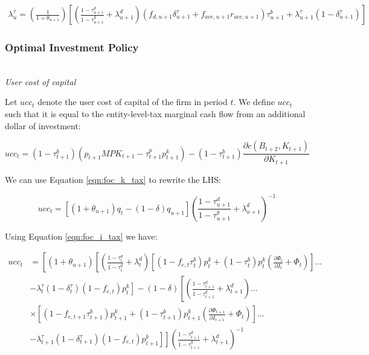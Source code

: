  \begin{equation}
\label{eqn:foc_ktau_tax}
\begin{split}
 \lambda^{\tau}_{u} = \left(\frac{1}{1+\theta_{u+1}}\right)\left[\left(\frac{1-\tau^{d}_{u+1}}{1-\tau^{g}_{u+1}} + \lambda^{d}_{u+1} \right)\left(f_{d,u+1}\delta^{\tau}_{u+1}+f_{ace,u+1}r_{ace,u+1}\right)\tau^{b}_{u+1} + \lambda^{\tau}_{u+1}(1-\delta^{\tau}_{u+1})\right] 
 \end{split}
\end{equation}



\subsubsection{Optimal Investment Policy}

\ \\
\noindent\noindent \emph{User cost of capital}

Let $ucc_{t}$ denote the user cost of capital of the firm in period $t$.  We define $ucc_{t}$ such that it is equal to the entity-level-tax marginal cash flow from an additional dollar of investment:

\begin{equation}
ucc_{t} = (1-\tau^{b}_{t+1})\left(p_{t+1}MPK_{t+1}-\tau^{p}_{t+1}p^{k}_{t+1}\right)- (1-\tau^{b}_{t+1}) \frac{\partial c(B_{t+2},K_{t+1})}{\partial K_{t+1}}
\end{equation}


We can use Equation \ref{eqn:foc_k_tax} to rewrite the LHS:

\begin{equation}
ucc_{t} =  \left[\left({1+\theta_{u+1}}\right)q_{t} - (1-\delta)q_{u+1}\right] \left(\frac{1-\tau^{d}_{u+1}}{1-\tau^{g}_{u+1}} + \lambda^{d}_{u+1} \right)^{-1}
\end{equation}

Using Equation \ref{eqn:foc_i_tax} we have:

\begin{equation}
\begin{split}
ucc_{t} &=  \left[\left({1+\theta_{u+1}}\right)\left[\left(\frac{1-\tau^{d}_{t}}{1-\tau^{g}_{t}} + \lambda^{d}_{t}\right)\left[(1-f_{e,t}\tau^{b}_{t})p^{k}_{t}+ (1-\tau^{b}_{t})p^{k}_{t}\left(\frac{\partial \Phi_{t}}{\partial I_{t}} + \Phi_{t}\right)\right]... \right.\right. \\
& \left.\left. -\lambda^{\tau}_{t}(1-\delta^{\tau}_{t})(1-f_{e,t})p^{k}_{t}\right] - (1-\delta)\left[\left(\frac{1-\tau^{d}_{t+1}}{1-\tau^{g}_{t+1}} + \lambda^{d}_{t+1}\right)... \right.\right. \\
& \left.\left. \times \left[(1-f_{e,t+1}\tau^{b}_{t+1})p^{k}_{t+1}+ (1-\tau^{b}_{t+1})p^{k}_{t+1}\left(\frac{\partial \Phi_{t+1}}{\partial I_{t+1}} + \Phi_{t}\right)\right]... \right.\right. \\
& \left.\left. -\lambda^{\tau}_{t+1}(1-\delta^{\tau}_{t+1})(1-f_{e,t})p^{k}_{t+1}\right]\right] \left(\frac{1-\tau^{d}_{t+1}}{1-\tau^{g}_{t+1}} + \lambda^{d}_{t+1} \right)^{-1}
\end{split}
\end{equation}


